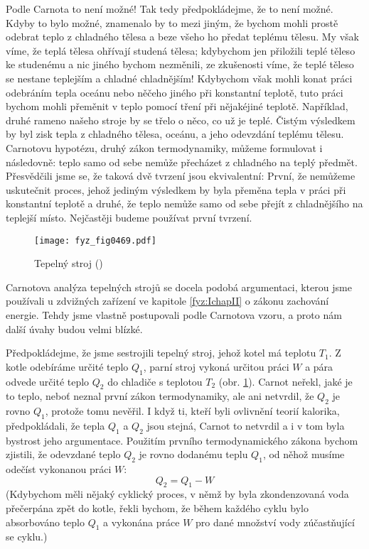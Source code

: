     Podle Carnota to není možné! Tak tedy předpokládejme, že to není možné. Kdyby to bylo možné,
    znamenalo by to mezi jiným, že bychom mohli prostě odebrat teplo z chladného tělesa a beze všeho
    ho předat teplému tělesu. My však víme, že teplá tělesa ohřívají studená tělesa; kdybychom jen
    přiložili teplé těleso ke studenému a nic jiného bychom nezměnili, ze zkušenosti víme, že teplé
    těleso se nestane teplejším a chladné chladnějším! Kdybychom však mohli konat práci odebráním
    tepla oceánu nebo něčeho jiného při konstantní teplotě, tuto práci bychom mohli přeměnit v teplo
    pomocí tření při nějakéjiné teplotě. Například, druhé rameno našeho stroje by se třelo o něco,
    co už je teplé. Čistým výsledkem by byl zisk tepla z chladného tělesa, oceánu, a jeho odevzdání
    teplému tělesu. Carnotovu hypotézu, druhý zákon termodynamiky, můžeme formulovat i následovně:
    teplo samo od sebe nemůže přecházet z chladného na teplý předmět. Přesvědčili jsme se, že taková
    dvě tvrzení jsou ekvivalentní: První, že nemůžeme uskutečnit proces, jehož jediným výsledkem by
    byla přeměna tepla v práci při konstantní teplotě a druhé, že teplo nemůže samo od sebe přejít z
    chladnějšího na teplejší místo. Nejčastěji budeme používat první tvrzení.

    \begin{figure}[ht!] %
      \centering
      \texttt{[image: fyz\_fig0469.pdf]}
      \caption{Tepelný stroj (\cite[s.~707]{Feynman01})}
      \label{fyz:fig0469}
    \end{figure}

    Carnotova analýza tepelných strojů se docela podobá argumentaci, kterou jsme používali u
    zdvižných zařízení ve kapitole \ref{fyz:IchapII} o zákonu zachování energie. Tehdy jsme vlastně
    postupovali podle Carnotova vzoru, a proto nám další úvahy budou velmi blízké.

    Předpokládejme, že jsme sestrojili tepelný stroj, jehož kotel má teplotu \(T_1\). Z kotle
    odebíráme určité teplo \(Q_1\), parní stroj vykoná určitou práci \(W\) a pára odvede určité
    teplo \(Q_2\) do chladiče s teplotou \(T_2\) (obr. \ref{fyz:fig0469}). Carnot neřekl, jaké je to
    teplo, neboť neznal první zákon termodynamiky, ale ani netvrdil, že \(Q_2\) je rovno \(Q_1\),
    protože tomu nevěřil. I když ti, kteří byli ovlivnění teorií kalorika, předpokládali, že tepla
    \(Q_1\) a \(Q_2\) jsou stejná, Carnot to netvrdil a i v tom byla bystrost jeho argumentace.
    Použitím prvního termodynamického zákona bychom zjistili, že odevzdané teplo \(Q_2\) je rovno
    dodanému teplu \(Q_1\), od něhož musíme odečíst vykonanou práci \(W\):
    \begin{equation}\label{fyz:eq577}
      Q_2 = Q_1 - W
    \end{equation}
    (Kdybychom měli nějaký cyklický proces, v němž by byla zkondenzovaná voda přečerpána zpět do
    kotle, řekli bychom, že během každého cyklu bylo absorbováno teplo \(Q_1\) a vykonána práce
    \(W\) pro dané množství vody zúčastňující se cyklu.)


